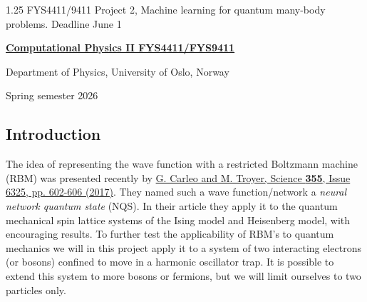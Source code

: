 \documentclass[%
oneside,                 %
final,                   %
10pt]{article}
\begin{document}

\newcommand{\exercisesection}[1]{\subsection*{#1}}






\thispagestyle{empty}

\begin{center}
{\LARGE\bf
\begin{spacing}{1.25}
FYS4411/9411 Project 2, Machine learning for  quantum many-body problems. Deadline June 1
\end{spacing}
}
\end{center}


\begin{center}
{\bf \href{{http://www.uio.no/studier/emner/matnat/fys/FYS4411/index-eng.html}}{Computational Physics II FYS4411/FYS9411}}
\end{center}

    \begin{center}
\centerline{{\small Department of Physics, University of Oslo, Norway}}
\end{center}
    

\begin{center}
Spring semester 2026
\end{center}

\vspace{1cm}


\subsection*{Introduction}

The idea of representing the wave function with
a restricted Boltzmann machine (RBM) was presented recently by \href{{http://science.sciencemag.org/content/355/6325/602}}{G. Carleo and M. Troyer, Science \textbf{355}, Issue 6325, pp. 602-606 (2017)}. They
named such a wave function/network a \textit{neural network quantum
state} (NQS). In their article they apply it to the quantum mechanical
spin lattice systems of the Ising model and Heisenberg model, with
encouraging results. To further test the applicability of RBM's to
quantum mechanics we will in this project apply it to a system of
two interacting electrons (or bosons)  confined to move in a harmonic oscillator trap.
It is possible to extend this system to more bosons or fermions, but we will limit ourselves to two particles only.
\end{document}
